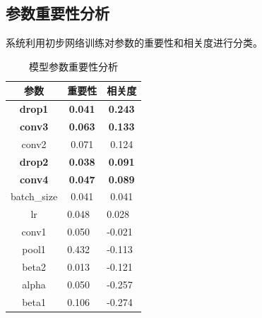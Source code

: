\subsection{参数重要性分析}
系统利用初步网络训练对参数的重要性和相关度进行分类。
\begin{table}[h]
\centering
\begin{tabular}[width=0.6\textwidth]{ccc}
\hline
\textbf{参数}                           & \textbf{重要性}                                     & \textbf{相关度}                                      \\ \hline
{\color[HTML]{343434} \textbf{drop1}} & {\color[HTML]{6434FC} \textbf{0.041}}            & {\color[HTML]{009901} \textbf{0.243}}             \\
\textbf{conv3}                        & {\color[HTML]{6434FC} \textbf{0.063}}            & {\color[HTML]{009901} \textbf{0.133}}             \\
conv2                                 & {\color[HTML]{6434FC} 0.071}                     & {\color[HTML]{009901} 0.124}                      \\
\textbf{drop2}                        & {\color[HTML]{6434FC} \textbf{0.038}}            & {\color[HTML]{009901} \textbf{0.091}}             \\
\textbf{conv4}                        & {\color[HTML]{6434FC} \textbf{0.047}}            & {\color[HTML]{009901} \textbf{0.089}}             \\
batch\_size                           & {\color[HTML]{6434FC} 0.041}                     & {\color[HTML]{009901} 0.041}                      \\
lr                                    & \multicolumn{1}{l}{{\color[HTML]{6434FC} 0.048}} & \multicolumn{1}{l}{{\color[HTML]{009901} 0.028}}  \\
conv1                                 & \multicolumn{1}{l}{{\color[HTML]{6434FC} 0.050}} & \multicolumn{1}{l}{{\color[HTML]{FE0000} -0.021}} \\
pool1                                 & \multicolumn{1}{l}{{\color[HTML]{6434FC} 0.432}} & \multicolumn{1}{l}{{\color[HTML]{FE0000} -0.113}} \\
beta2                                 & \multicolumn{1}{l}{{\color[HTML]{6434FC} 0.013}} & \multicolumn{1}{l}{{\color[HTML]{FE0000} -0.121}} \\
alpha                                 & \multicolumn{1}{l}{{\color[HTML]{6434FC} 0.050}} & \multicolumn{1}{l}{{\color[HTML]{FE0000} -0.257}} \\
beta1                                 & \multicolumn{1}{l}{{\color[HTML]{6434FC} 0.106}} & \multicolumn{1}{l}{{\color[HTML]{FE0000} -0.274}} \\ \hline
\end{tabular}
\caption{模型参数重要性分析}
\end{table}

